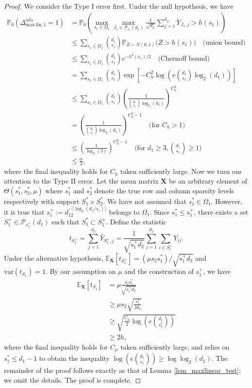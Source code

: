\documentclass{article}
\newcommand{\X}{\mathbf{X}}
\newcommand{\bbP}{\mathbb{P}}
\newcommand{\EE}{\mathbb{E}}
\newcommand{\linmax}{\text{max-lin}}
\theoremstyle{remark}
\begin{document}
\begin{proof}
    We consider the Type I error first. Under the null hypothesis, we have
    \begin{align*}
        \bbP_0\left(\Delta^{\text{ada}}_{\linmax, 1} = 1\right) &= \bbP_0\left(\max_{s_1 \in \Omega_1}\max_{J_1 \in \mathcal P_{s_1}\!(d_1)}\frac{1}{\sqrt{d_2}}\sum_{j = 1}^{d_2}\bar{Y}_{J_1, j} > h(s_1)\right) \\
        &\leq \sum_{s_1 \in \Omega_1}{d_1 \choose s_1}\bbP_{Z \sim N(0,1)}\big(Z > h(s_1)\big) \quad \text{(union bound)} \\
        &\leq \sum_{s_1 \in \Omega_1}{d_1 \choose s_1}e^{-h^2(s_1)/2} \quad \text{(Chernoff bound)} \\
        &= \sum_{s_1 \in \Omega_1}{d_1 \choose s_1} \exp\left[-C_h^2\log\left(e {d_1 \choose s_1}\log_2(d_1)\right)\right] \\
        &\leq \sum_{s_1 \in \Omega_1}{d_1 \choose s_1} \left(\frac{1}{{d_1 \choose s_1}\log_2(d_1)}\right)^{C_h^2} \\
        &= \left(\frac{1}{{d_1 \choose s_1}\log_2(d_1)}\right)^{C_h^2- 1} \quad \text{(for $C_h > 1$)} \\
        &\leq \left(\frac{1}{\log_2(3)}\right)^{C_h^2- 1} \quad \text{(for $d_1 \geq 3, {d_1 \choose s_1} \geq 1$)} \\
        &\leq \frac{\alpha}{2},
    \end{align*}
    where the final inequality holds for $C_h$ taken sufficiently large. Now we turn our attention to the Type II error. Let the mean matrix $\mathbf{X}$ be an arbitrary element of $\Theta(s^*_1, s^*_2, \mu)$ where $s^*_1$ and $s^*_2$ denote the true row and column sparsity levels respectively with support $S^*_1 \times S^*_2$. We have not assumed that $s_1^* \in \Omega_1$. However, it is true that $s_1^+ := d_12^{-\lceil \log_2(d_1/s_1)\rceil}$ belongs to $\Omega_1$. Since $s_1^* \leq s_1^+$, there exists a set $S_1^+ \in \mathcal{P}_{s_1^+}(d_1)$ such that $S_1^* \subset S_1^+$. Define the statistic
    \[t_{S^+_1} = \sum_{j = 1}^{d_2}\bar{Y}_{S^+_1, j} = \frac{1}{\sqrt{s^+_1d_2}}\sum_{j = 1}^{d_2}\sum_{i \in  S^+_1}Y_{ij}.\]
    Under the alternative hypothesis, $\EE_{\X} [t_{S^+_1}] = (\mu s_2s^*_1) / \sqrt{s_1^+d_2}$ and $\text{var}(t_{S_1}) = 1$. By our assumption on $\mu$ and the construction of $s_1^+$, we have
    \begin{align*}
        \EE_{\X} [t_{S_1}] &= \mu \frac{s_2s^*_1}{\sqrt{s_1^+d_2}} \\
        &\geq \mu s_2\sqrt{\frac{s^*_1}{2d_2}} \\
        &\geq \sqrt{\frac{C_{\mu}}{2}\log\left(e {d_1 \choose s^*_1}\right)} \\
        &\geq 2h,
    \end{align*}
    where the final inequality holds for $C_\mu$ taken sufficiently large, and relies on $s_1^* \leq d_1 - 1$ to obtain the inequality $\log\left(e{d_1 \choose s_1}\right) \geq \log \log_2 (d_1)$. The remainder of the proof follows exactly as that of Lemma \ref{lem_maxlinear_test}; we omit the details. The proof is complete.
\end{proof}
\end{document}

